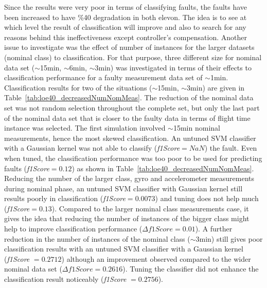 Since the results were very poor in terms of classifying faults, the faults have been increased to have \%40 degradation in both elevon. 
The idea is to see at which level the result of classification will improve and also to search for any reasons behind this ineffectiveness except controller's compensation. 
Another issue to investigate was the effect of number of instances for the larger datasets (nominal class) to classification. 
For that purpose, three different size for nominal data set ($\sim$15min, $\sim$6min, $\sim$3min) was investigated in terms of their effects to classification performance for a faulty measurement data set of $\sim$1min. 
Classification results for two of the situations ($\sim$15min, $\sim$3min) are given in Table~\ref{tab:loe40_decreasedNumNomMeas}. 
The reduction of the nominal data set was not random selection throughout the complete set, but only the last part of the nominal data set that is closer to the faulty data in terms of flight time instance was selected. 
The first simulation involved $\sim$15min nominal measurements, hence the most skewed classification. 
An untuned SVM classifier with a Gaussian kernel was not able to classify (\emph{f1Score}$ = NaN$) the fault. 
Even when tuned, the classification performance was too poor to be used for predicting faults (\emph{f1Score}$ = 0.12$) as shown in Table~\ref{tab:loe40_decreasedNumNomMeas}. 
Reducing the number of the larger class, gyro and accelerometer measurements during nominal phase, an untuned SVM classifier with Gaussian kernel still results poorly in classification (\emph{f1Score}$ = 0.0073$) and tuning does not help much (\emph{f1Score}$ = 0.13$). 
Compared to the larger nominal class measurements case, it gives the idea that reducing the number of instances of the bigger class might help to improve classification performance ($\Delta f1Score = 0.01$).
A further reduction in the number of instances of the nominal class ($\sim$3min) still gives poor classification results with an untuned SVM classifier with a Gaussian kernel (\emph{f1Score} $= 0.2712$) although an improvement observed compared to the wider nominal data set ($\Delta f1Score = 0.2616$). 
Tuning the classifier did not enhance the classification result noticeably (\emph{f1Score} $= 0.2756$).


